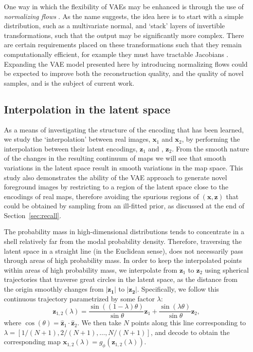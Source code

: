 \documentclass[fleqn,usenatbib]{mnras}
\begin{document}
One way in which the flexibility of VAEs may be enhanced is through the use of \emph{normalizing flows} \citep{rezende/etal:2015}. As the name suggests, the idea here is to start with a simple distribution, such as a multivariate normal, and `stack' layers of invertible transformations, such that the output may be significantly more complex. There are certain requirements placed on these transformations such that they remain computationally efficient, for example they must have tractable Jacobians \citep{rezende/etal:2015}.  
Expanding the VAE model presented here by introducing normalizing flows could be expected to improve both the reconstruction quality, and the quality of novel samples, and is the subject of current work.

\subsection{Interpolation in the latent space}
\label{sec:latent_interpolation} 
As a means of investigating the structure of the encoding that has been learned, we study the `interpolation' between real images, $\mathbf x_1$ and $\mathbf x_2$, by performing the interpolation between their latent encodings, $\mathbf z_1$ and , $\mathbf z_2$. From the smooth nature of the changes in the resulting continuum of maps we will see that smooth variations in the latent space result in smooth variations in the map space. This study also demonstrates the ability of the VAE approach to generate novel foreground images by restricting to a region of the latent space close to the encodings of real maps, therefore avoiding the spurious regions of $(\mathbf x, \mathbf z)$ that could be obtained by sampling from an ill-fitted prior, as discussed at the end of Section~\ref{sec:recall}.


The probability mass in high-dimensional distributions tends to concentrate in a shell relatively far from the modal probability density. Therefore, traversing the latent space in a straight line (in the Euclidean sense), does not necessarily pass through areas of high probability mass. In order to keep the interpolated points within areas of high probability mass, we interpolate from $\mathbf z_1$ to $\mathbf z_2$ using spherical trajectories that traverse great circles in the latent space, as the distance from the origin smoothly changes from $|\mathbf{z_1}|$ to $|\mathbf{z_2}|$. Specifically, we follow this continuous trajectory parametrized by some factor $\lambda$: 
\begin{equation}
\label{eq:interpolation}
    \mathbf{z}_{1,2}(\lambda) = \frac{\sin((1- \lambda) \theta)}{\sin \theta} \mathbf z_1 + \frac{\sin(\lambda \theta)}{\sin \theta} \mathbf z_2,
\end{equation}
where $\cos(\theta) = \hat{\mathbf z}_1 \cdot \hat{\mathbf z}_2$. We then take $N$ points along this line corresponding to $\lambda = [1/(N+1), 2/(N+1), \dots, N/(N+1)]$, and decode to obtain the corresponding map $\mathbf x_{1,2}(\lambda) = g_\phi(\mathbf z_{1,2}(\lambda))$.
\end{document}
